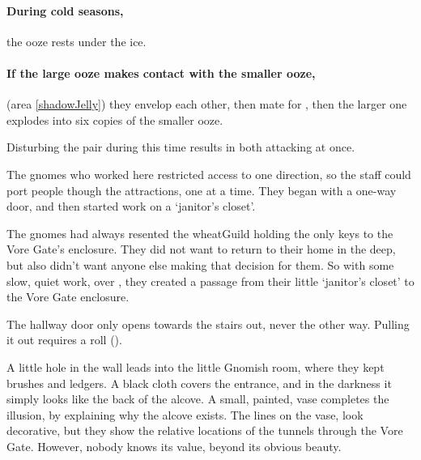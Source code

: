 \begin{multicols}{2}
\paragraph{During cold seasons,}
the ooze rests under the ice.

\paragraph{If the large ooze makes contact with the smaller ooze,}
(area \vref{shadowJelly})
they envelop each other, then mate for , then the larger one explodes into six copies of the smaller ooze.

Disturbing the pair during this time results in  both attacking at once.


\begin{exampletext}
  The gnomes who worked here restricted access to one direction, so the staff could port people though the attractions, one at a time.
  They began with a one-way door, and then started work on a `janitor's closet'.

  The gnomes had always resented the \gls{wheatGuild} holding the only keys to the Vore Gate's enclosure.
  They did not want to return to their home in the \gls{deep}, but also didn't want anyone else making that decision for them.
  So with some slow, quiet work, over , they created a passage from their little `janitor's closet' to the Vore Gate enclosure.
\end{exampletext}

The hallway door only opens towards the stairs out, never the other way.
Pulling it out requires a  roll (\tn[11]).

A little hole in the wall leads into the little Gnomish room, where they kept brushes and ledgers.
A black cloth covers the entrance, and in the darkness it simply looks like the back of the alcove.
A small, painted, vase completes the illusion, by explaining why the alcove exists.
The lines on the vase, look decorative, but they show the relative locations of the tunnels through the Vore Gate.
However, nobody knows its value, beyond its obvious beauty.




\end{multicols}

